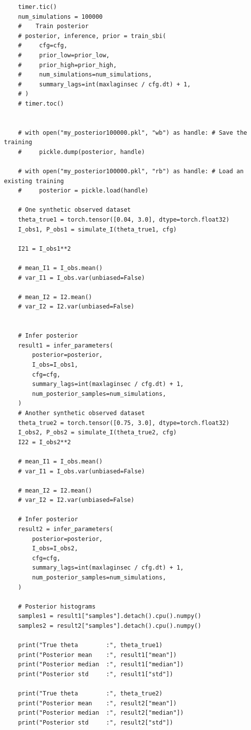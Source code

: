 \documentclass{article}
\begin{document}
\begin{verbatim}
    timer.tic()
    num_simulations = 100000
    #    Train posterior
    # posterior, inference, prior = train_sbi(
    #     cfg=cfg,
    #     prior_low=prior_low,
    #     prior_high=prior_high,
    #     num_simulations=num_simulations,
    #     summary_lags=int(maxlaginsec / cfg.dt) + 1,
    # )
    # timer.toc()


    # with open("my_posterior100000.pkl", "wb") as handle: # Save the training
    #     pickle.dump(posterior, handle)

    # with open("my_posterior100000.pkl", "rb") as handle: # Load an existing training
    #     posterior = pickle.load(handle)
    
    # One synthetic observed dataset
    theta_true1 = torch.tensor([0.04, 3.0], dtype=torch.float32)
    I_obs1, P_obs1 = simulate_I(theta_true1, cfg)

    I21 = I_obs1**2

    # mean_I1 = I_obs.mean()
    # var_I1 = I_obs.var(unbiased=False)

    # mean_I2 = I2.mean()
    # var_I2 = I2.var(unbiased=False)  
    

    # Infer posterior
    result1 = infer_parameters(
        posterior=posterior,
        I_obs=I_obs1,
        cfg=cfg,
        summary_lags=int(maxlaginsec / cfg.dt) + 1,
        num_posterior_samples=num_simulations,
    )
    # Another synthetic observed dataset
    theta_true2 = torch.tensor([0.75, 3.0], dtype=torch.float32)
    I_obs2, P_obs2 = simulate_I(theta_true2, cfg)
    I22 = I_obs2**2

    # mean_I1 = I_obs.mean()
    # var_I1 = I_obs.var(unbiased=False)

    # mean_I2 = I2.mean()
    # var_I2 = I2.var(unbiased=False)    

    # Infer posterior
    result2 = infer_parameters(
        posterior=posterior,
        I_obs=I_obs2,
        cfg=cfg,
        summary_lags=int(maxlaginsec / cfg.dt) + 1,
        num_posterior_samples=num_simulations,
    )

    # Posterior histograms
    samples1 = result1["samples"].detach().cpu().numpy()
    samples2 = result2["samples"].detach().cpu().numpy()

    print("True theta        :", theta_true1)
    print("Posterior mean    :", result1["mean"])
    print("Posterior median  :", result1["median"])
    print("Posterior std     :", result1["std"])

    print("True theta        :", theta_true2)
    print("Posterior mean    :", result2["mean"])
    print("Posterior median  :", result2["median"])
    print("Posterior std     :", result2["std"])



\end{verbatim}
\end{document}
